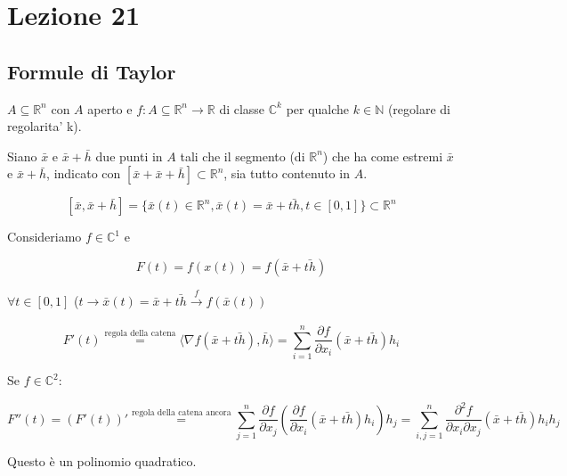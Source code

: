 \documentclass[../appunti-analisi.tex]{subfiles}
\begin{document}
\section{Lezione 21}

\subsection{Formule di Taylor}

$A \subseteq \mathbb{R}^{n}$ con $A$ aperto e $f:A \subseteq \mathbb{R}^{n} \rightarrow \mathbb{R}$ di classe $\mathbb{C}^{k}$ per qualche $k \in \mathbb{N}$ (regolare di regolarita' k).

Siano $\bar{x}$ e $\bar{x} +\bar{h} $ due punti in $A$ tali che il segmento (di $\mathbb{R}^{n}$) che ha come estremi $\bar{x} $ e $\bar{x} + \bar{h} $, indicato con $[\bar{x} +\bar{x} +\bar{h} ] \subset \mathbb{R}^{n}$, sia tutto contenuto in $A$.

       \[
           [\bar{x} , \bar{x} +\bar{h} ] = \{\bar{x} (t) \in \mathbb{R}^{n}, \bar{x} (t) = \bar{x} +\bar{th}, t \in [0,1]\} \subset \mathbb{R}^{n}
       \]

       Consideriamo $f \in \mathbb{C}^{1}$ e 

       \[
           F(t) = f(x(t)) = f(\bar{x} +\bar{th} ) 
       \]

       $\forall t \in [0,1]$ ($t \rightarrow  \bar{x} (t) = \bar{x} + \bar{th} \xrightarrow[]{\text{$f$}}f(\bar{x} (t))$

       \[
           F'(t) \overset{\text{regola della catena}}{=} \langle \nabla f(\bar{x} +\bar{th} ),\bar{h}  \rangle = \sum^{n}_{i=1} \frac{\partial f}{\partial x_i} (\bar{x} +\bar{th} ) h_i
       \]

       Se $f \in  \mathbb{C}^{2}$:

       \[
           F''(t) = (F'(t))' \overset{\text{regola della catena ancora}}{=} \sum^{n}_{j=1} \frac{\partial f}{\partial x_j} ( \frac{\partial f}{\partial x_i}(\bar{x} +\bar{th} ) h_i) h_j = \sum^{n}_{i,j=1} \frac{\partial^{2} f}{\partial x_i \partial x_j} (\bar{x} + \bar{th} ) h_i h_j
       \]

       Questo è un polinomio quadratico.

       
\end{document}
